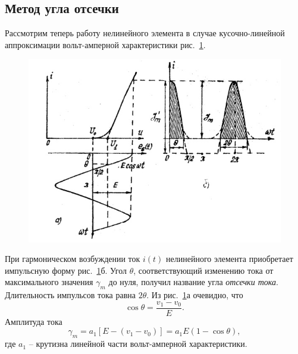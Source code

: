 \subsection{Метод угла отсечки}
Рассмотрим теперь работу нелинейного элемента в случае кусочно-линейной аппроксимации вольт-амперной характеристики рис.~\ref{pic:5}.
\begin{figure}[h!]
	\centering
	\includegraphics[width=0.7\linewidth]{picture/pic5.jpg}
	\caption{}
	\label{pic:5}
\end{figure}
При гармоническом возбуждении ток $i(t)$ нелинейного элемента приобретает импульсную форму рис.~\ref{pic:5}б. Угол $\theta$, соответствующий изменению тока от максимального значения $\gamma_m$ до нуля, получил название угла \textit{отсечки тока}. Длительность импульсов тока равна $2\theta$. Из рис.~\ref{pic:5}а очевидно, что
\begin{equation}
\cos\theta=\frac{v_1-v_0}{E}.
\label{eq:13}
\end{equation}
Амплитуда тока
\begin{equation}
\gamma_m=a_1[E-(v_1-v_0)]=a_1E(1-\cos\theta),
\label{eq:14}
\end{equation}
где $a_1$ -- крутизна линейной части вольт-амперной характеристики.


